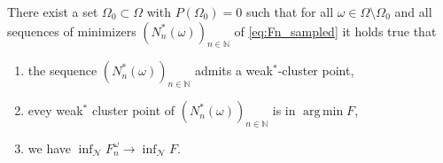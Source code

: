 \documentclass[onefignum,onetabnum]{siamonline250211}
\newcommand{\N}{\mathcal{N}}
\DeclareMathOperator*{\argmin}{arg\,min}
\begin{document}
\begin{corollary}\label{cor:convofminimizers} There exist a set $\Omega_0\subset \Omega$ with $P(\Omega_0)=0$ such that for all $\omega \in \Omega \setminus \Omega_0$ and all sequences of minimizers $(N^*_n(\omega))_{n\in\mathbb{N}}$ of \cref{eq:Fn_sampled} it holds true that
\begin{enumerate}[label=(\roman*),leftmargin=*]
    \item the sequence $(N^*_n(\omega))_{n\in\mathbb{N}}$ admits a weak$^*$-cluster point,
    \item evey weak$^*$ cluster point of $(N^*_n(\omega))_{n\in\mathbb{N}}$ is in $\argmin F$,
    \item we have $\inf_\N F_n^\omega \to \inf_\N F$.
\end{enumerate}
\end{corollary}
\end{document}
